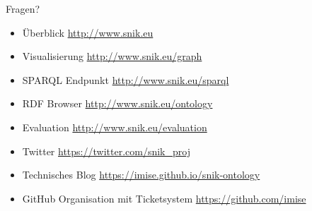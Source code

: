 \documentclass{beamer}
\begin{document}
\begin{frame}[fragile]{Fragen?}
\begin{itemize}
\vspace{0.5em}%
\item Überblick \url{http://www.snik.eu}
\item Visualisierung \url{http://www.snik.eu/graph}
\item SPARQL Endpunkt \url{http://www.snik.eu/sparql}
\item RDF Browser \url{http://www.snik.eu/ontology}
\item Evaluation \url{http://www.snik.eu/evaluation}
\item Twitter \url{https://twitter.com/snik\_proj}
\item Technisches Blog \url{https://imise.github.io/snik-ontology}
\item GitHub Organisation mit Ticketsystem \url{https://github.com/imise}
\end{itemize}
\end{frame}
\end{document}

